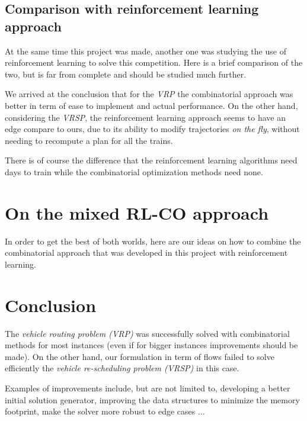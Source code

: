 \documentclass[14pt,a4paper]{article}
\theoremstyle{definition}
\numberwithin{equation}{subsection}
\begin{document}
\subsection{Comparison with reinforcement learning approach}

At the same time this project was made, another one was studying the use of reinforcement learning to solve this competition. Here is a brief comparison of the two, but is far from complete and should be studied much further.

We arrived at the conclusion that for the \emph{VRP}  the combinatorial approach was better in term of ease to implement and actual performance. On the other hand, considering the \emph{VRSP}, the reinforcement learning approach seems to have an edge compare to ours, due to its ability to modify trajectories \emph{on the fly}, without needing to recompute a plan for all the trains.

There is of course the difference that the reinforcement learning algorithms need days to train while the combinatorial optimization methods need none. 


\newpage
\section{On the mixed RL-CO approach}

In order to get the best of both worlds, here are our ideas on how to combine the combinatorial approach that was developed in this project with reinforcement learning.

\todo[inline]{\blindtext}





\section*{Conclusion}
\label{sec:conclusion}

The \emph{vehicle routing problem (VRP)} was successfully  solved with combinatorial methods for most instances (even if for bigger instances improvements should be made). On the other hand, our formulation in term of flows failed to solve efficiently the \emph{vehicle re-scheduling problem (VRSP)} in this case.


Examples of improvements include, but are not limited to, developing a better initial solution generator, improving the data structures to minimize the memory footprint, make the solver more robust to edge cases $\ldots$ 
\end{document}
